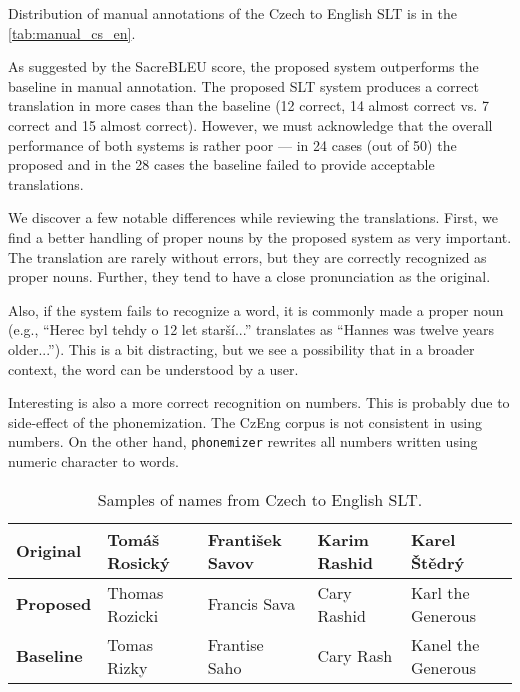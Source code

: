 Distribution of manual annotations of the Czech to English SLT is in the \cref{tab:manual_cs_en}. 

As suggested by the SacreBLEU score, the proposed system outperforms the baseline in manual annotation. The proposed SLT system produces a correct translation in more cases than the baseline (12 correct, 14 almost correct vs. 7 correct and 15 almost correct). However, we must acknowledge that the overall performance of both systems is rather poor --- in 24 cases (out of 50) the proposed and in the 28 cases the baseline failed to provide acceptable translations.

We discover a few notable differences while reviewing the translations. First, we find a better handling of proper nouns by the proposed system as very important. The translation are rarely without errors, but they are correctly recognized as proper nouns. Further, they tend to have a close pronunciation as the original.

Also, if the system fails to recognize a word, it is commonly made a proper noun (e.g., ``Herec byl tehdy o 12 let starší...'' translates as ``Hannes was twelve years older...''). This is a bit distracting, but we see a possibility that in a broader context, the word can be understood by a user.

Interesting is also a more correct recognition on numbers. This is probably due to side-effect of the phonemization. The CzEng corpus is not consistent in using numbers. On the other hand, \texttt{phonemizer} rewrites all numbers written using numeric character to words.

\begin{table}[]
	\centering
	\small
	\begin{tabular}{l|llll}
		\textbf{Original} & Tomáš Rosický & František Savov  & Karim Rashid     & Karel Štědrý       \\ \hline
		\textbf{Proposed} & Thomas Rozicki     & Francis Sava & Cary Rashid      & Karl the Generous  \\
		\textbf{Baseline} & Tomas Rizky    & Frantise Saho    & Cary Rash & Kanel the Generous
	\end{tabular}
	\caption{Samples of names from Czech to English SLT.}
	\label{tab:cs_en_names}
\end{table}

